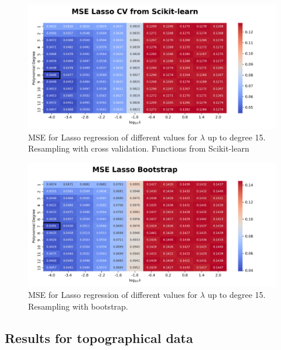 \documentclass{article}
\begin{document}
\begin{figure}[htbp]
    \centering
    \includegraphics[width=\textwidth]{Project1/figures/Franke/Heatmap_MSE_Lasso_CV_from_Scikit-learn.png}
    \caption{MSE for Lasso regression of different values for $\lambda$ up to degree 15. Resampling with cross validation. Functions from Scikit-learn}
    \label{fig:LassoCVsklearn}
\end{figure}

\begin{figure}[htbp]
    \centering
    \includegraphics[width=\textwidth]{Project1/figures/Franke/Heatmap_MSE_Lasso_Bootstrap.png}
    \caption{MSE for Lasso regression of different values for $\lambda$ up to degree 15. Resampling with bootstrap.}
    \label{fig:LassoBootstrap}
\end{figure}


\newpage
\subsection{Results for topographical data}
\end{document}
